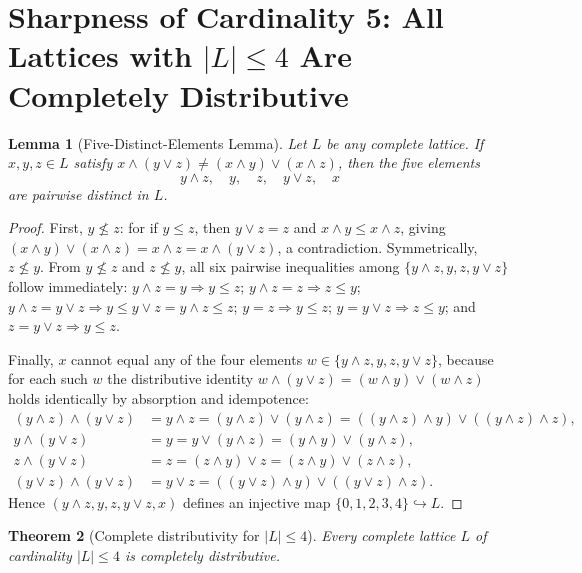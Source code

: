 \documentclass[11pt,a4paper]{article}
\theoremstyle{plain}
\newtheorem{theorem}{Theorem}[section]
\newtheorem{lemma}[theorem]{Lemma}
\theoremstyle{definition}
\begin{document}
\section{Sharpness of Cardinality 5: All Lattices with \texorpdfstring{$|L| \le 4$}{|L| <= 4} Are Completely Distributive}

\begin{lemma}[Five-Distinct-Elements Lemma]
\label{lem:five-distinct}
Let $L$ be any complete lattice. If $x, y, z \in L$ satisfy
$x \wedge (y \vee z) \neq (x \wedge y) \vee (x \wedge z)$, then the five elements
\[
  y \wedge z, \quad y, \quad z, \quad y \vee z, \quad x
\]
are pairwise distinct in $L$.
\end{lemma}

\begin{proof}
First, $y \not\le z$: for if $y \le z$, then $y \vee z = z$ and $x \wedge y \le x \wedge z$,
giving $(x \wedge y) \vee (x \wedge z) = x \wedge z = x \wedge (y \vee z)$, a contradiction.
Symmetrically, $z \not\le y$. From $y \not\le z$ and $z \not\le y$, all six pairwise
inequalities among $\{y \wedge z, y, z, y \vee z\}$ follow immediately:
$y \wedge z = y \Rightarrow y \le z$; $y \wedge z = z \Rightarrow z \le y$;
$y \wedge z = y \vee z \Rightarrow y \le y \vee z = y \wedge z \le z$; $y = z \Rightarrow y \le z$;
$y = y \vee z \Rightarrow z \le y$; and $z = y \vee z \Rightarrow y \le z$.

Finally, $x$ cannot equal any of the four elements $w \in \{y \wedge z, y, z, y \vee z\}$,
because for each such $w$ the distributive identity $w \wedge (y \vee z) = (w \wedge y) \vee (w \wedge z)$
holds identically by absorption and idempotence:
\begin{align*}
  (y \wedge z) \wedge (y \vee z) &= y \wedge z = (y \wedge z) \vee (y \wedge z)
    = ((y \wedge z) \wedge y) \vee ((y \wedge z) \wedge z), \\
  y \wedge (y \vee z) &= y = y \vee (y \wedge z) = (y \wedge y) \vee (y \wedge z), \\
  z \wedge (y \vee z) &= z = (z \wedge y) \vee z = (z \wedge y) \vee (z \wedge z), \\
  (y \vee z) \wedge (y \vee z) &= y \vee z = ((y \vee z) \wedge y) \vee ((y \vee z) \wedge z).
\end{align*}
Hence $(y \wedge z, y, z, y \vee z, x)$ defines an injective map $\{0,1,2,3,4\} \hookrightarrow L$.
\end{proof}

\begin{theorem}[Complete distributivity for $|L| \le 4$]
\label{thm:size4}
Every complete lattice $L$ of cardinality $|L| \le 4$ is completely distributive.
\end{theorem}
\end{document}
